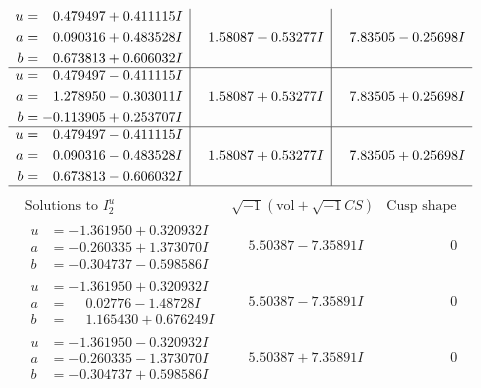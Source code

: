 \documentclass[1p]{elsarticle_modified}
\theoremstyle{definition}
\newcommand{\I}{\sqrt{-1}}
\begin{document}
$$\begin{array}{c|c|c}
\begin{aligned}
u &= \phantom{-}0.479497 + 0.411115 I \\
a &= \phantom{-}0.090316 + 0.483528 I \\
b &= \phantom{-}0.673813 + 0.606032 I\end{aligned}
 & \phantom{-}1.58087 - 0.53277 I & \phantom{-}7.83505 - 0.25698 I \\ \hline\begin{aligned}
u &= \phantom{-}0.479497 - 0.411115 I \\
a &= \phantom{-}1.278950 - 0.303011 I \\
b &= -0.113905 + 0.253707 I\end{aligned}
 & \phantom{-}1.58087 + 0.53277 I & \phantom{-}7.83505 + 0.25698 I \\ \hline\begin{aligned}
u &= \phantom{-}0.479497 - 0.411115 I \\
a &= \phantom{-}0.090316 - 0.483528 I \\
b &= \phantom{-}0.673813 - 0.606032 I\end{aligned}
 & \phantom{-}1.58087 + 0.53277 I & \phantom{-}7.83505 + 0.25698 I\\
 \hline 
 \end{array}$$\newpage$$\begin{array}{c|c|c}  
\text{Solutions to }I^u_{2}& \I (\text{vol} + \sqrt{-1}CS) & \text{Cusp shape}\\
 \hline 
\begin{aligned}
u &= -1.361950 + 0.320932 I \\
a &= -0.260335 + 1.373070 I \\
b &= -0.304737 - 0.598586 I\end{aligned}
 & \phantom{-}5.50387 - 7.35891 I & \phantom{-0.000000 } 0 \\ \hline\begin{aligned}
u &= -1.361950 + 0.320932 I \\
a &= \phantom{-}0.02776 - 1.48728 I \\
b &= \phantom{-}1.165430 + 0.676249 I\end{aligned}
 & \phantom{-}5.50387 - 7.35891 I & \phantom{-0.000000 } 0 \\ \hline\begin{aligned}
u &= -1.361950 - 0.320932 I \\
a &= -0.260335 - 1.373070 I \\
b &= -0.304737 + 0.598586 I\end{aligned}
 & \phantom{-}5.50387 + 7.35891 I & \phantom{-0.000000 } 0 \\ \hline\begin{aligned}

\end{aligned}
\end{array}$$
\end{document}
